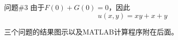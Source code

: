 \documentclass[12pt]{ctexart}
\begin{document}
    \begin{problem}{问题\#3}
        由于$F(0)+G(0)=0$，因此
        $$
        u(x,y)=xy+x+y
        $$
    \end{problem}
    三个问题的结果图示以及MATLAB计算程序附在后面。
    \begin{figure}[htbp]
        \small
        \centering
    \end{figure}
\end{document}
